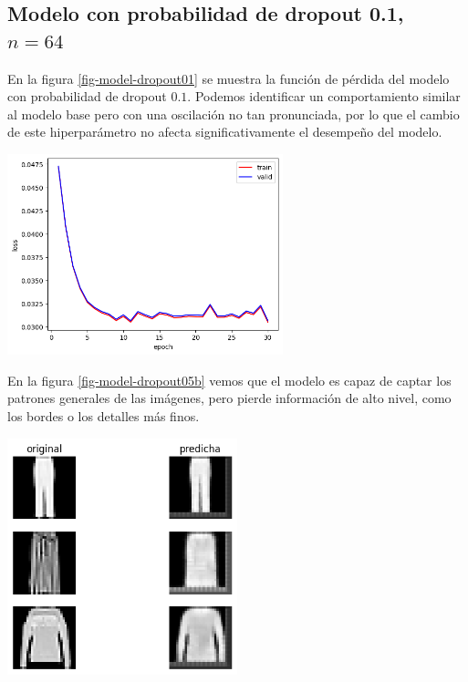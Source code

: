 \documentclass[aps,prl,reprint,groupedaddress]{revtex4-2}
\newenvironment{Figura}
  {\par\medskip\noindent\minipage{\linewidth}}
  {\endminipage\par\medskip}
\begin{document}
\subsection{Modelo con probabilidad de dropout 0.1, $n=64$}

En la figura \ref{fig-model-dropout01} se muestra la función de pérdida del
modelo con probabilidad de dropout $0.1$. Podemos identificar un comportamiento 
similar al modelo base pero con una oscilación no tan pronunciada, por lo que el 
cambio de este hiperparámetro no afecta significativamente el desempeño del modelo.
\begin{Figura}
  \centering
  \includegraphics[width=0.60\textwidth]{figs1/modelo_n64_dropout01.png}
  \label{fig-model-dropout01}
\end{Figura}

En la figura \ref{fig-model-dropout05b} vemos que el modelo es capaz de captar 
los patrones generales de las imágenes, pero pierde información de alto nivel, 
como los bordes o los detalles más finos.
\begin{Figura}
  \centering
  \includegraphics[width=0.5\textwidth]{figs1/test_modelo_n64_dropout_01.png}
  \label{fig-model-dropout05b}
\end{Figura}
\end{document}

